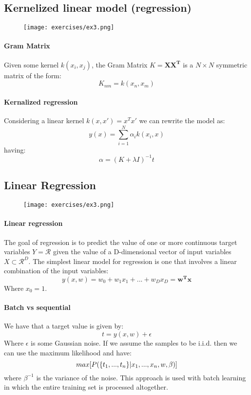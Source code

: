 \subsection{Kernelized linear model (regression)}
\begin{figure}[H]
    \centering
    \texttt{[image: exercises/ex3.png]}
\end{figure}

\paragraph{Gram Matrix}
Given some kernel $k(x_i,x_j)$, the Gram Matrix $K=\bm{XX^T}$ is a $N\times N$ symmetric matrix of the form:
\[K_{nm}=k(x_n,x_m)\]

\paragraph{Kernalized regression}
Considering a linear kernel $k(x,x')=x^Tx'$ we can rewrite the model as:
\[y(x)=\sum_{i=1}^N\alpha_i k(x_i,x)\]
having:
\[\alpha=(K+\lambda I)^{-1}t\]

\subsection{Linear Regression}

\begin{figure}[H]
    \centering
    \texttt{[image: exercises/ex3.png]}
\end{figure}


\paragraph{Linear regression}
The goal of regression is to predict the value of one or more continuous target variables $Y=\mathcal{R}$ given the value of a D-dimensional vector of input variables $X \subset \mathcal{R}^D$. The simplest linear model for regression is one that involves a linear combination of the input variables:
\[y(x,w)=w_0+w_1x_1+...+w_Dx_D=\bm{w^Tx}\]
Where $x_0=1$.

\paragraph{Batch vs sequential}


We have that a target value is given by:
\[t=y(x,w) + \epsilon\]
Where $\epsilon$ is some Gaussian noise. If we assume the samples to be i.i.d. then we can use the maximum likelihood and have:
\[max[P(\lbrace{t_1,...,t_n}\rbrace|x_1,...,x_n,w,\beta)]\]
where $\beta^{-1}$ is the variance of the noise. This approach is used with batch learning in which the entire training set is processed altogether.\\

